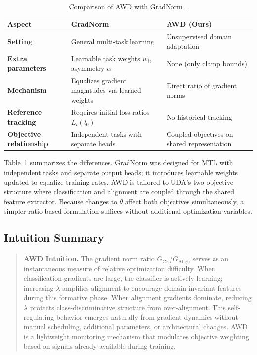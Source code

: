 \documentclass[pdflatex,sn-mathphys-num]{sn-jnl}
\theoremstyle{thmstyleone}
\theoremstyle{thmstyletwo}
\theoremstyle{thmstylethree}
\begin{document}
\begin{table}[t]
    \centering
    \caption{Comparison of AWD with GradNorm~\cite{chen2018gradnorm}.}
    \label{tab:gradnorm_comparison}
    \begin{tabularx}{\columnwidth}{l X X}
        \toprule
        \textbf{Aspect} & \textbf{GradNorm} & \textbf{AWD (Ours)} \\
        \midrule
        \textbf{Setting} & General multi-task learning & Unsupervised domain adaptation \\
        \midrule
        \textbf{Extra parameters} & Learnable task weights $w_i$, asymmetry $\alpha$ & None (only clamp bounds) \\
        \midrule
        \textbf{Mechanism} & Equalizes gradient magnitudes via learned weights & Direct ratio of gradient norms \\
        \midrule
        \textbf{Reference tracking} & Requires initial loss ratios $L_i(t_0)$ & No historical tracking \\
        \midrule
        \textbf{Objective relationship} & Independent tasks with separate heads & Coupled objectives on shared representation \\
        \bottomrule
    \end{tabularx}
\end{table}

Table~\ref{tab:gradnorm_comparison} summarizes the differences. GradNorm was designed for MTL with independent tasks and separate output heads; it introduces learnable weights updated to equalize training rates. AWD is tailored to UDA's two-objective structure where classification and alignment are coupled through the shared feature extractor. Because changes to $\theta$ affect both objectives simultaneously, a simpler ratio-based formulation suffices without additional optimization variables.

\subsection{Intuition Summary}

\begin{quote}
\textbf{AWD Intuition.} The gradient norm ratio $G_{\text{CE}}/G_{\text{Align}}$ serves as an instantaneous measure of relative optimization difficulty. When classification gradients are large, the classifier is actively learning; increasing $\lambda$ amplifies alignment to encourage domain-invariant features during this formative phase. When alignment gradients dominate, reducing $\lambda$ protects class-discriminative structure from over-alignment. This self-regulating behavior emerges naturally from gradient dynamics without manual scheduling, additional parameters, or architectural changes. AWD is a lightweight monitoring mechanism that modulates objective weighting based on signals already available during training.
\end{quote}
\end{document}
